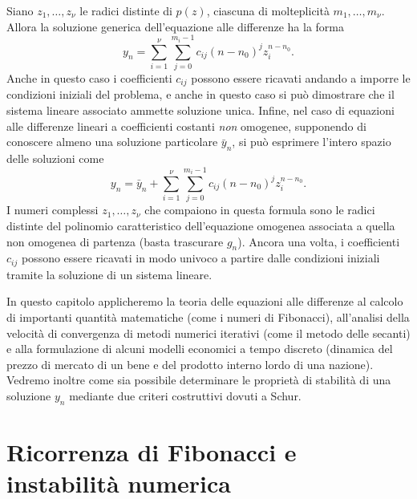 Siano $z_1,\dots,z_\nu$ le radici distinte di $p(z)$,
ciascuna di molteplicità $m_1,\dots,m_\nu$.
Allora la soluzione generica dell'equazione alle differenze ha la forma
\begin{equation} \label{eq:soluzione-radici-multiple}
y_n = \sum_{i=1}^\nu \sum_{j=0}^{m_i-1} c_{ij} (n-n_0)^j z_i^{n-n_0}.
\end{equation}
Anche in questo caso i coefficienti $c_{ij}$ possono essere ricavati
andando a imporre le condizioni iniziali del problema,
e anche in questo caso si può dimostrare che il sistema lineare
associato ammette soluzione unica.
Infine, nel caso di equazioni alle differenze lineari a coefficienti costanti
\emph{non} omogenee, supponendo di conoscere almeno una soluzione
particolare $\bar{y}_n$, si può esprimere l'intero spazio delle soluzioni come
\begin{equation} \label{eq:soluzione-radici-multiple-non-omo}
y_n = \bar{y}_n + \sum_{i=1}^\nu \sum_{j=0}^{m_i-1} c_{ij} (n-n_0)^j z_i^{n-n_0}.
\end{equation}
I numeri complessi $z_1,\dots,z_\nu$ che compaiono in questa formula
sono le radici distinte del polinomio caratteristico dell'equazione omogenea
associata a quella non omogenea di partenza (basta trascurare $g_n$).
Ancora una volta, i coefficienti $c_{ij}$ possono essere ricavati
in modo univoco a partire dalle condizioni iniziali tramite
la soluzione di un sistema lineare.

In questo capitolo applicheremo la teoria delle equazioni
alle differenze al calcolo di importanti quantità matematiche
(come i numeri di Fibonacci), all'analisi della velocità di convergenza
di metodi numerici iterativi (come il metodo delle secanti)
e alla formulazione di alcuni modelli economici a tempo discreto
(dinamica del prezzo di mercato di un bene
e del prodotto interno lordo di una nazione).
Vedremo inoltre come sia possibile determinare le proprietà di stabilità
di una soluzione $y_n$ mediante due criteri costruttivi dovuti a Schur.

\section{Ricorrenza di Fibonacci e instabilità numerica} \label{sec:bitfatale}

